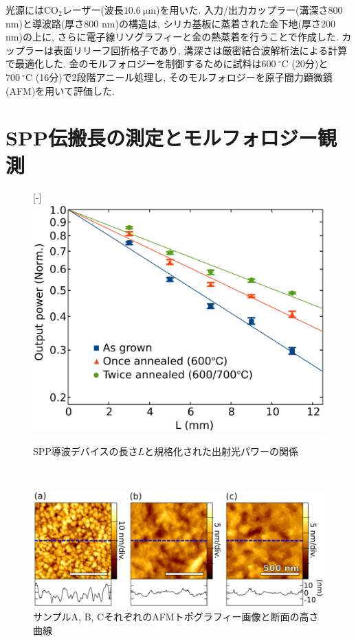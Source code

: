 \documentclass[a4,10truept]{jsarticle}
\begin{document}
光源には$\mathrm{CO_2}\!$レーザー(波長$10.6\:\mathrm{\mu m}$)を用いた. 入力/出力カップラー(溝深さ800 nm)と導波路(厚さ800 nm)の構造は, シリカ基板に蒸着された金下地(厚さ200 nm)の上に, さらに電子線リソグラフィーと金の熱蒸着を行うことで作成した. カップラーは表面リリーフ回折格子であり, 溝深さは厳密結合波解析法による計算で最適化した. 
金のモルフォロジーを制御するために試料は$600\:\mathrm{^\circ C}$ (20分)と$700\:\mathrm{^\circ C}$ (16分)で2段階アニール処理し, そのモルフォロジーを原子間力顕微鏡(AFM)を用いて評価した.

\vspace{-0.2em}
\section{SPP伝搬長の測定とモルフォロジー観測}
\vspace{-0.5em}
\begin{figure}
  \centering
\begin{minipage}{\hsize}
     \raisebox{0pt}[\dimexpr\height-\baselineskip\relax]{\includegraphics[width=0.9\hsize]{propagation_length.eps}}
    \caption{SPP導波デバイスの長さ$L$と規格化された出射光パワーの関係}
       \label{fig:propagation_length}
\end{minipage}\\
\begin{minipage}{\hsize}
     \includegraphics[width=\hsize]{morphology.eps}
        \caption{サンプルA, B, CそれぞれのAFMトポグラフィー画像と断面の高さ曲線}
    \label{fig:morphology}
\end{minipage}
\end{figure}
\end{document}
